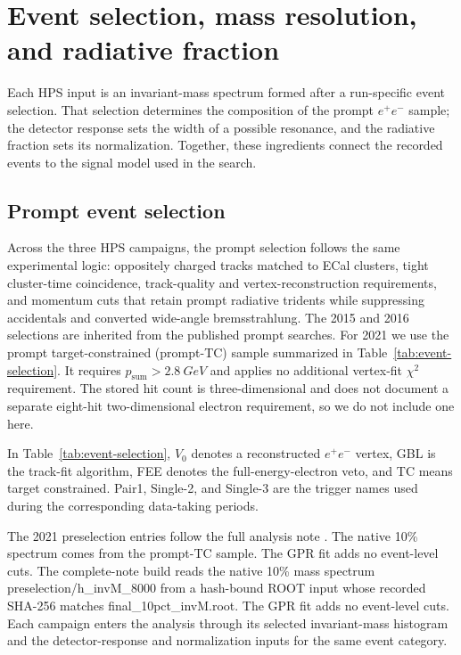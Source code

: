 \section{Event selection, mass resolution, and radiative fraction}
\label{sec:event-selection}

Each HPS input is an invariant-mass spectrum formed after a run-specific event
selection. That selection determines the composition of the prompt $e^+e^-$ sample;
the detector response sets the width of a possible resonance, and the radiative
fraction sets its normalization. Together, these ingredients connect the recorded
events to the signal model used in the search.

\subsection{Prompt event selection}

Across the three HPS campaigns, the prompt selection follows the same experimental
logic:
oppositely charged tracks matched to ECal clusters, tight cluster-time coincidence,
track-quality and vertex-reconstruction requirements, and momentum cuts that retain
prompt radiative tridents while suppressing accidentals and converted wide-angle
bremsstrahlung. The 2015 and 2016 selections are inherited from the published prompt
searches. For 2021 we use the prompt target-constrained (prompt-TC) sample summarized in
Table~\ref{tab:event-selection}. It requires
$p_{\mathrm{sum}}>\SI{2.8}{GeV}$ and applies no additional vertex-fit $\chi^2$
requirement. The stored hit count is three-dimensional and does not document a separate
eight-hit two-dimensional electron requirement, so we do not include one here.

In Table~\ref{tab:event-selection}, $V_0$ denotes a reconstructed $e^+e^-$ vertex,
GBL is the track-fit algorithm, FEE denotes the full-energy-electron veto, and TC means
target constrained. Pair1, Single-2, and Single-3 are the trigger names used during the
corresponding data-taking periods.





The 2021 preselection entries follow the full analysis note
\cite[Sec.~4.8 and App.~A]{HPS2021FullAnalysisNote}.
\ifwritingsample
The native 10\% spectrum comes from the prompt-TC sample. The GPR fit adds no
event-level cuts.
\else
The complete-note build reads the native 10\% mass spectrum preselection/h\_invM\_8000 from a
hash-bound ROOT input whose recorded SHA-256 matches final\_10pct\_invM.root. The GPR
fit adds no event-level cuts.
\fi
Each campaign enters the analysis through its selected invariant-mass histogram and
the detector-response and normalization inputs for the same event category.

